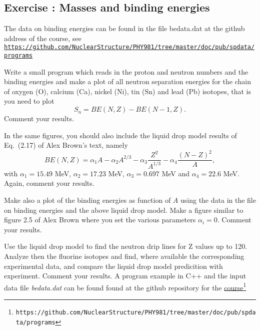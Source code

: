 \documentclass[graybox,sectrefs,envcountresetchap,open=right]{svmonodo}
\newenvironment{doconceexercise}{}{}
\newcounter{doconceexercisecounter}
\begin{document}
\begin{doconceexercise}

\subsection*{Exercise \thedoconceexercisecounter: Masses and binding energies}


The data on binding energies can be found in the file bedata.dat at the github address of the course, see
\href{{https://github.com/NuclearStructure/PHY981/tree/master/doc/pub/spdata/programs}}{\nolinkurl{https://github.com/NuclearStructure/PHY981/tree/master/doc/pub/spdata/programs}}


Write a small program which reads in the proton and neutron numbers and the binding energies 
and make a plot of all neutron separation energies for the chain of oxygen (O), calcium (Ca), nickel (Ni), tin (Sn) and lead (Pb) isotopes, that is you need to plot
\[
S_n= BE(N,Z)-BE(N-1,Z).
\]
Comment your results.

In the same figures, you should also include the liquid drop model results of Eq.~(2.17) of Alex Brown's text, namely
\[
BE(N,Z)= \alpha_1A-\alpha_2A^{2/3}-\alpha_3\frac{Z^2}{A^{1/3}}-\alpha_4\frac{(N-Z)^2}{A},
\]
with $\alpha_1=15.49$ MeV, $\alpha_2=17.23$ MeV, $\alpha_3=0.697$ MeV and $\alpha_4=22.6$ MeV.
Again, comment your results.

Make also a plot of the binding energies as function of $A$ using the data in the file on binding energies and the above liquid drop model.  Make a figure similar to figure 2.5 of Alex Brown where you set the various parameters $\alpha_i=0$. Comment your results.

Use the liquid drop model to find the neutron drip lines   for Z values up to 120.
Analyze then the fluorine isotopes and find, where available the corresponding experimental data, and compare the liquid drop model predicition with experiment. 
Comment your results.
A program example in C++ and the input data file \emph{bedata.dat} can be found found at the github repository for the \href{{https://github.com/NuclearStructure/PHY981/tree/master/doc/pub/spdata/programs}}{course}\footnote{\texttt{https://github.com/NuclearStructure/PHY981/tree/master/doc/pub/spdata/programs}}



\end{doconceexercise}
\end{document}
